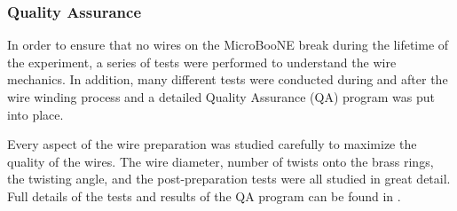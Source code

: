 \subsubsection{Quality Assurance}


In order to ensure that no wires on the MicroBooNE \lartpc break during the lifetime of the experiment, a series of tests were performed to understand the wire mechanics. In addition, many different tests were conducted during and after the wire winding process and a detailed Quality Assurance (QA) program was put into place.

Every aspect of the wire preparation was studied carefully to maximize the quality of the wires. The wire diameter, number of twists onto the brass rings, the twisting angle, and the post-preparation tests were all studied in great detail. Full details of the tests and results of the QA program can be found in \cite{Wire_Paper}.

%
%

